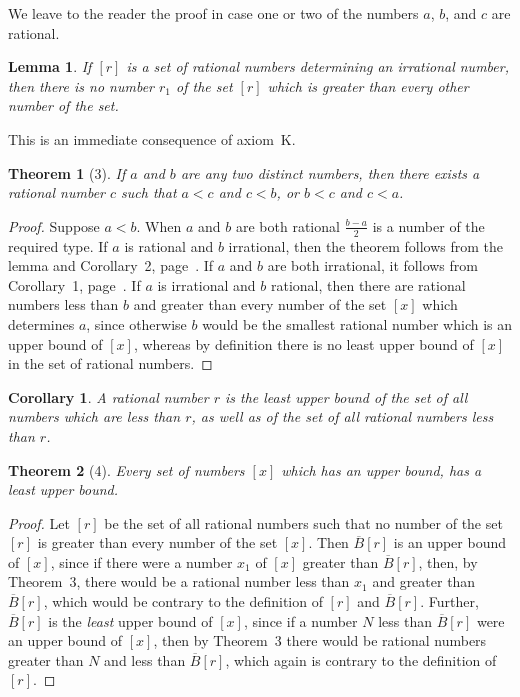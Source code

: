 \documentclass[a4paper,12pt]{book}[2004/02/16]
\providecommand{\hyperlink}[2]{#2}
\providecommand{\hypertarget}[2]{#2}
\theoremstyle{ilemma}
\newtheorem*{lemma}{Lemma}
\theoremstyle{itheorem}
\newtheorem{theorem}{Theorem}
\theoremstyle{iother}
\theoremstyle{icorollary}
\newtheorem{corollary}{Corollary}
\theoremstyle{numcorollary}
\theoremstyle{idefinition}
\begin{document}
We leave to the reader the proof in case one or two of the
numbers $a$, $b$, and $c$ are rational.
\begin{lemma}
If $[r]$ is a set of rational numbers determining an
irrational number, then there is no number $r_1$ of the set $[r]$
which is greater than every other number of the set.
\end{lemma}
This is an immediate consequence of \hyperlink{axiomK}{axiom~K}.
\begin{theorem}[3]\hypertarget{thm3}{}
If $a$ and $b$ are any two distinct numbers, then
there exists a rational number $c$ such that $a<c$ and $c<b$, or $b<c$
and $c<a$.
\end{theorem}
\begin{proof}
Suppose $a<b$. When $a$ and $b$ are both rational
$\frac{b-a}{2}$ is a number of the required type. If $a$ is rational
and $b$ irrational, then the theorem follows from the lemma and
Corollary~\hyperlink{cor2p5}{2}, page~\pageref{cor2p5}. If $a$ and $b$ are both
irrational, it follows from Corollary~\hyperlink{cor1p5}{1}, page~\pageref{cor1p5}. If $a$
is irrational and $b$ rational, then there are rational numbers less
than $b$ and greater than every number of the set $[x]$ which
determines $a$, since otherwise $b$ would be the smallest rational
number which is an upper bound of $[x]$, whereas by definition there
is no least upper bound of $[x]$ in the set of rational numbers.
\end{proof}
\begin{corollary}
A rational number $r$ is the least upper bound of
the set of all numbers which are less than $r$, as well as of the
set of all rational numbers less than $r$.
\end{corollary}
\begin{theorem}[4]\hypertarget{thm4}{}
Every set of numbers $[x]$ which has an upper bound, has a least upper
bound.
\end{theorem}
\begin{proof}
Let $[r]$ be the set of all rational numbers such that
no number of the set $[r]$ is greater than every number of the set
$[x]$. Then $\overline{B}[r]$ is an upper bound of $[x]$, since if
there were a number $x_1$ of $[x]$ greater than $\overline{B}[r]$,
then, by Theorem~\hyperlink{thm3}{3}, there would be a rational number less than $x_1$
and greater than $\overline{B}[r]$, which would be contrary to the
definition of $[r]$ and $\overline{B}[r]$.
Further, $\overline{B}[r]$ is the \textit{least} upper bound of $[x]$,
since if a number $N$ less than $\overline{B}[r]$ were an upper bound
of $[x]$, then by Theorem~\hyperlink{thm3}{3} there would be rational numbers greater
than $N$ and less than $\overline{B}[r]$, which again is contrary to
the definition of $[r]$.
\end{proof}
\end{document}

